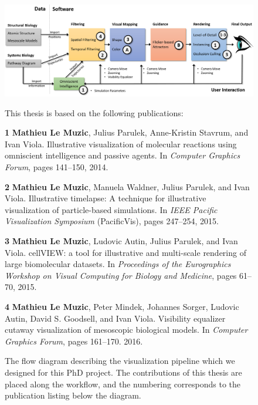 \begin{figure}
	\centering	
	\caption{The flow diagram describing the visualization pipeline which we designed for this PhD project. 
		The contributions of this thesis are placed along the workflow, and the numbering corresponds to the publication listing below the diagram.}
	
	\subfloat
	{
		\centering
		\includegraphics[width=1\linewidth]{"graphics/master_diagram"}
	}	
	\subfloat
	{		
		This thesis is based on the following publications:		
		\begin{list}{}{}			
			\label{fig:list-contributions}
			\item[\textbf{1}]\textbf{Mathieu Le Muzic}, Julius Parulek, Anne-Kristin Stavrum, and Ivan Viola. Illustrative visualization of molecular reactions using omniscient intelligence and passive agents. In \textit{Computer Graphics Forum}, pages 141–150, 2014. 
			
			\item[\textbf{2}]\textbf{Mathieu Le Muzic}, Manuela Waldner, Julius Parulek, and Ivan Viola. Illustrative timelapse: A technique for illustrative visualization of particle-based simulations. In \textit{IEEE Pacific Visualization Symposium} (PacificVis), pages 247–254, 2015.
			
			\item[\textbf{3}]\textbf{Mathieu Le Muzic}, Ludovic Autin, Julius Parulek, and Ivan Viola. cellVIEW: a tool for illustrative and multi-scale rendering of large biomolecular datasets. In \textit{Proceedings of the Eurographics Workshop on Visual Computing for Biology and Medicine}, pages 61–70, 2015.
			
			\item[\textbf{4}]\textbf{Mathieu Le Muzic}, Peter Mindek, Johannes Sorger, Ludovic Autin, David S. Goodsell, and Ivan Viola. Visibility equalizer cutaway visualization of mesoscopic biological models. In \textit{Computer Graphics Forum}, pages 161–170. 2016.				
		\end{list}			
		
}
\end{figure}
